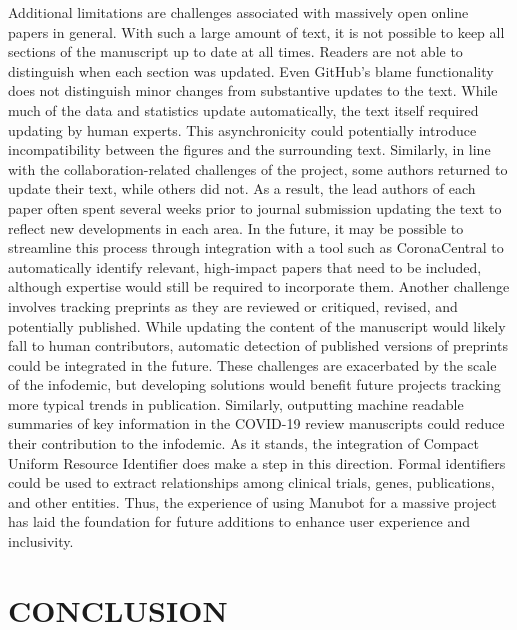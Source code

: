 \documentclass[twocolumn]{ceurart}
\begin{document}
Additional limitations are challenges associated with massively open online papers in general.
With such a large amount of text, it is not possible to keep all sections of the manuscript up to date at all times.
Readers are not able to distinguish when each section was updated.
Even GitHub's blame functionality does not distinguish minor changes from substantive updates to the text.
While much of the data and statistics update automatically, the text itself required updating by human experts.
This asynchronicity could potentially introduce incompatibility between the figures and the surrounding text.
Similarly, in line with the collaboration-related challenges of the project, some authors returned to update their text, while others did not.
As a result, the lead authors of each paper often spent several weeks prior to journal submission updating the text to reflect new developments in each area.
In the future, it may be possible to streamline this process through integration with a tool such as CoronaCentral \citep{Ybg667S0} to automatically identify relevant, high-impact papers that need to be included, although expertise would still be required to incorporate them.
Another challenge involves tracking preprints as they are reviewed or critiqued, revised, and potentially published.
While updating the content of the manuscript would likely fall to human contributors, automatic detection of published versions of preprints \citep{pESBLU4c} could be integrated in the future.
These challenges are exacerbated by the scale of the infodemic, but developing solutions would benefit future projects tracking more typical trends in publication.
Similarly, outputting machine readable summaries of key information in the COVID-19 review manuscripts could reduce their contribution to the infodemic.
As it stands, the integration of Compact Uniform Resource Identifier does make a step in this direction.
Formal identifiers could be used to extract relationships among clinical trials, genes, publications, and other entities.
Thus, the experience of using Manubot for a massive project has laid the foundation for future additions to enhance user experience and inclusivity.

\hypertarget{conclusion}{%
\section{CONCLUSION}\label{conclusion}}
\end{document}
